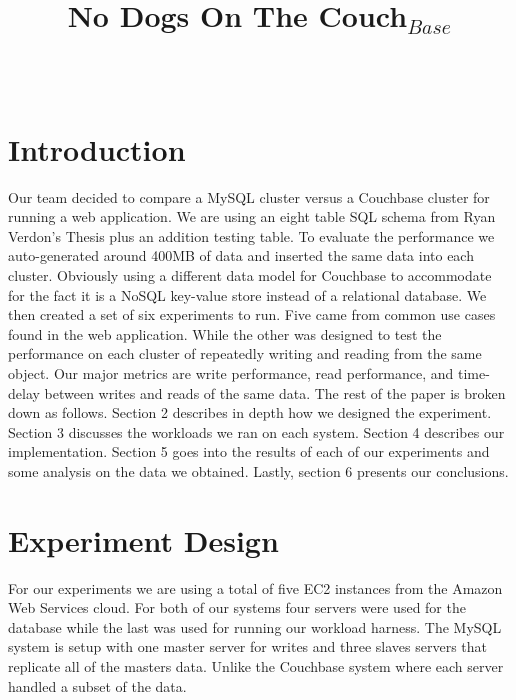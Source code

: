 \documentclass[]{IEEEtran}
\begin{document}
\title{No Dogs On The Couch$_{Base}$}


\author{
\\
}

\maketitle

\thispagestyle{empty}
\pagestyle{empty}

\section{Introduction}
Our team decided to compare a MySQL cluster versus a Couchbase cluster for running a
web application. We are using an eight table SQL schema from Ryan Verdon's Thesis plus an addition testing table. To evaluate
the performance we auto-generated around 400MB of data and inserted the same data into each cluster.
Obviously using a different data model for Couchbase to accommodate for the fact it is a NoSQL key-value store
instead of a relational database. We then created a set of six experiments to run. Five came from common 
use cases found in the web application. While the other was designed to test the performance on each cluster
of repeatedly writing and reading from the same object. Our major metrics are write performance, read performance,
and time-delay between writes and reads of the same data. The rest of the paper is broken down as follows.
Section 2 describes in depth how we designed the experiment. Section 3 discusses the workloads we ran on each system. Section 4 describes our implementation. Section 5 goes
into the results of each of our experiments and some analysis on the data we obtained. Lastly, section 6 presents 
our conclusions.

\section{Experiment Design}
For our experiments we are using a total of five EC2 instances from the Amazon Web Services cloud. For both of our systems four servers were used for the database while the last was used for running our workload harness. The MySQL system is setup with one master server for writes and three slaves servers that replicate all of the masters data. Unlike the Couchbase system where each server handled a subset of the data.
\end{document}
